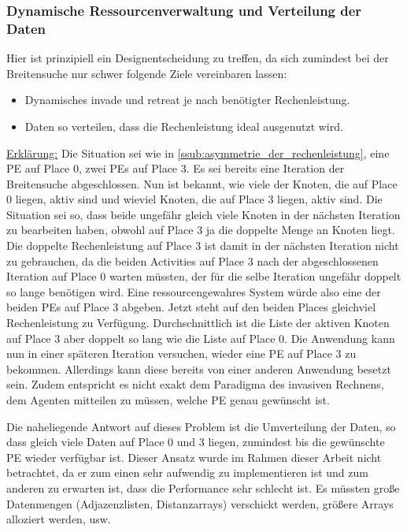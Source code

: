 \subsubsection{Dynamische Ressourcenverwaltung und Verteilung der Daten} %
\label{ssub:dynamische_ressourcenverwaltung}
Hier ist prinzipiell ein Designentscheidung zu treffen, da sich zumindest bei der Breitensuche nur schwer folgende Ziele vereinbaren lassen:
\begin{itemize}
	\item Dynamisches invade und retreat je nach benötigter Rechenleistung.
	\item Daten so verteilen, dass die Rechenleistung ideal ausgenutzt wird.
\end{itemize}
\underline{Erklärung:} Die Situation sei wie in \ref{ssub:asymmetrie_der_rechenleistung}, eine PE auf Place 0, zwei PEs auf Place 3. Es sei bereits eine Iteration der Breitensuche abgeschlossen. Nun ist bekannt, wie viele der Knoten, die auf Place 0 liegen, aktiv sind und wieviel Knoten, die auf Place 3 liegen, aktiv sind. Die Situation sei so, dass beide ungefähr gleich viele Knoten in der nächsten Iteration zu bearbeiten haben, obwohl auf Place 3 ja die doppelte Menge an Knoten liegt. Die doppelte Rechenleistung auf Place 3 ist damit in der nächsten Iteration nicht zu gebrauchen, da die beiden Activities auf Place 3 nach der abgeschlossenen Iteration auf Place 0 warten müssten, der für die selbe Iteration ungefähr doppelt so lange benötigen wird. Eine ressourcengewahres System würde also eine der beiden PEs auf Place 3 abgeben. Jetzt steht auf den beiden Places gleichviel Rechenleistung zu Verfügung. Durchschnittlich ist die Liste der aktiven Knoten auf Place 3 aber doppelt so lang wie die Liste auf Place 0. Die Anwendung kann nun in einer späteren Iteration versuchen, wieder eine PE auf Place 3 zu bekommen. Allerdings kann diese bereits von einer anderen Anwendung besetzt sein. Zudem entspricht es nicht exakt dem Paradigma des invasiven Rechnens, dem Agenten mitteilen zu müssen, welche PE genau gewünscht ist.

Die naheliegende Antwort auf dieses Problem ist die Umverteilung der Daten, so dass gleich viele Daten auf Place 0 und 3 liegen, zumindest bis die gewünschte PE wieder verfügbar ist. Dieser Ansatz wurde im Rahmen dieser Arbeit nicht betrachtet, da er zum einen sehr aufwendig zu implementieren ist und zum anderen zu erwarten ist, dass die Performance sehr schlecht ist. Es müssten große Datenmengen (Adjazenzlisten, Distanzarrays) verschickt werden, größere Arrays alloziert werden, usw.

